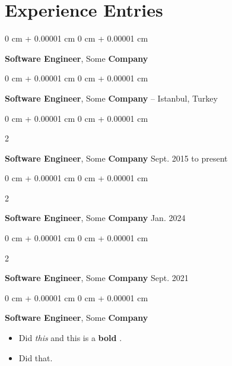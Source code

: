 \documentclass[10pt, letterpaper]{article}
\newenvironment{highlights}{
    \begin{itemize}[
        topsep=0.10 cm,
        parsep=0.10 cm,
        partopsep=0pt,
        itemsep=0pt,
        leftmargin=0 cm + 10pt
    ]
}{
    \end{itemize}
} %
\newenvironment{onecolentry}{
    \begin{adjustwidth}{
        0 cm + 0.00001 cm
    }{
        0 cm + 0.00001 cm
    }
}{
    \end{adjustwidth}
} %
\newenvironment{twocolentry}[2][]{
    \onecolentry
    \def\secondColumn{#2}
    \setcolumnwidth{\fill, 4.2cm}
    \begin{paracol}{2}
}{
    \switchcolumn \raggedleft \secondColumn
    \end{paracol}
    \endonecolentry
} %
\let\hrefWithoutArrow\href
\renewcommand{\href}[2]{\hrefWithoutArrow{#1}{\mbox{\ifthenelse{\equal{#2}{}}{ }{#2 }\raisebox{.15ex}{\footnotesize \faExternalLink*}}}}
\begin{document}
    
    \section{Experience Entries}

        
        \begin{onecolentry}
            \textbf{Software Engineer}, Some \textbf{Company}\end{onecolentry}


        \vspace{0.1 cm}

        \begin{onecolentry}
            \textbf{Software Engineer}, Some \textbf{Company} -- Istanbul, Turkey\end{onecolentry}


        \vspace{0.1 cm}

        \begin{twocolentry}{
            Sept. 2015 to present
        }
            \textbf{Software Engineer}, Some \textbf{Company}\end{twocolentry}


        \vspace{0.1 cm}

        \begin{twocolentry}{
            Jan. 2024
        }
            \textbf{Software Engineer}, Some \textbf{Company}\end{twocolentry}


        \vspace{0.1 cm}

        \begin{twocolentry}{
            Sept. 2021
        }
            \textbf{Software Engineer}, Some \textbf{Company}\end{twocolentry}


        \vspace{0.1 cm}

        \begin{onecolentry}
            \textbf{Software Engineer}, Some \textbf{Company}    \begin{highlights}
                \item Did \textit{this} and this is a \textbf{bold} \href{https://example.com}{link}.
                \item Did that.
            \end{highlights}
        \end{onecolentry}
\end{document}
